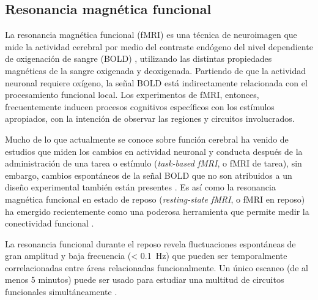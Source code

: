 \subsection{Resonancia magnética funcional}
La resonancia magnética funcional (fMRI) es una técnica de neuroimagen que mide la actividad cerebral por medio del contraste endógeno del nivel dependiente de oxigenación de sangre (BOLD) \parencite{Ogawa1993}, utilizando las distintas propiedades magnéticas de la sangre oxigenada y deoxigenada.
Partiendo de que la actividad neuronal requiere oxígeno, la señal BOLD está indirectamente relacionada con el procesamiento funcional local.
Los experimentos de fMRI, entonces, frecuentemente inducen procesos cognitivos específicos con los estímulos apropiados, con la intención de observar las regiones y circuitos involucrados. \par
Mucho de lo que actualmente se conoce sobre función cerebral ha venido de estudios que miden los cambios en actividad neuronal y conducta después de la administración de una tarea o estímulo (\textit{task-based fMRI}, o fMRI de tarea), sin embargo, cambios espontáneos de la señal BOLD que no son atribuidos a un diseño experimental también están presentes \parencite{Fox2007}.
Es así como la resonancia magnética funcional en estado de reposo (\textit{resting-state fMRI}, o fMRI en reposo) ha emergido recientemente como una poderosa herramienta que permite medir la conectividad funcional \parencite{Biswal2010}.\par
La resonancia funcional durante el reposo revela fluctuaciones espontáneas de gran amplitud y baja frecuencia (\deactivatequoting\SI{< 0.1}{\hertz}\activatequoting) que pueden ser temporalmente correlacionadas entre áreas relacionadas funcionalmente.
Un único escaneo (de al menos 5 minutos) puede ser usado para estudiar una multitud de circuitos funcionales simultáneamente \parencite{Biswal2010}.

